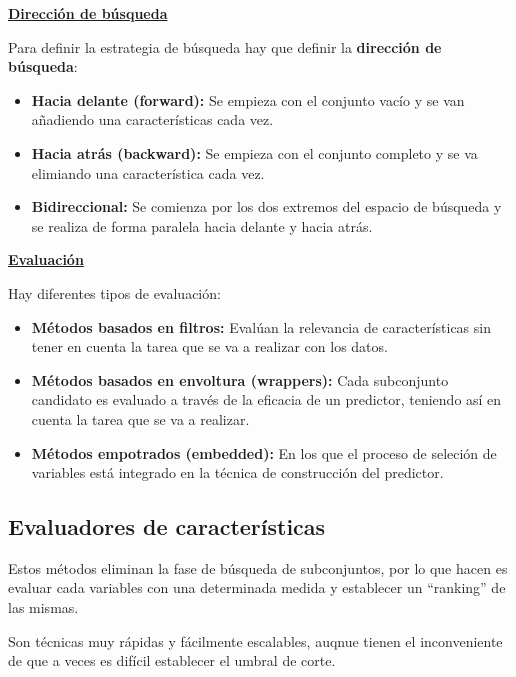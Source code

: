 \documentclass[12pt, letterpaper]{article}
\begin{document}
\vspace{1 em}
\textbf{\underline{Dirección de búsqueda}}

Para definir la estrategia de búsqueda hay que definir la \textbf{dirección de búsqueda}:
\begin{itemize}
    \item \textbf{Hacia delante (forward):} Se empieza con el conjunto vacío y se van añadiendo una características cada vez.
    \item \textbf{Hacia atrás (backward):} Se empieza con el conjunto completo y se va elimiando una característica cada vez.
    \item \textbf{Bidireccional:} Se comienza por los dos extremos del espacio de búsqueda y se realiza de forma paralela hacia delante y hacia atrás.
\end{itemize}

\vspace{1 em}
\textbf{\underline{Evaluación}}

Hay diferentes tipos de evaluación:
\begin{itemize}
    \item \textbf{Métodos basados en filtros:} Evalúan la relevancia de características sin tener en cuenta la tarea que se va a realizar con los datos.
    \item \textbf{Métodos basados en envoltura (wrappers):} Cada subconjunto candidato es evaluado a través de la eficacia de un predictor, teniendo así en cuenta la tarea que se va a realizar.
    \item \textbf{Métodos empotrados (embedded):} En los que el proceso de seleción de variables está integrado en la técnica de construcción del predictor.
\end{itemize}

\subsection{Evaluadores de características}
Estos métodos eliminan la fase de búsqueda de subconjuntos, por lo que hacen es evaluar cada variables con una determinada medida y establecer un ``ranking'' de las mismas.

Son técnicas muy rápidas y fácilmente escalables, auqnue tienen el inconveniente de que a veces es difícil establecer el umbral de corte.
\end{document}
